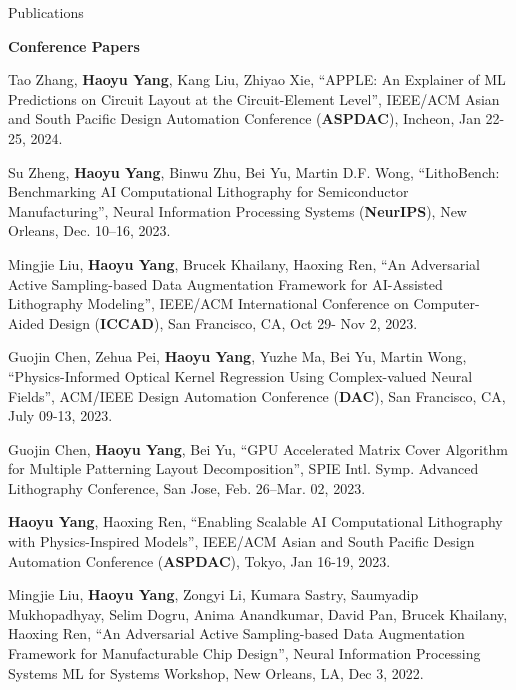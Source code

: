 \begin{rSection}{Publications}
\begin{description}[font=\normalfont]
\end{description}

\textbf{Conference Papers}
\begin{description}[font=\normalfont]
	
	\item[{[C31]}] Tao Zhang, \textbf{Haoyu Yang}, Kang Liu, Zhiyao Xie, ``APPLE: An Explainer of ML Predictions on Circuit Layout at the Circuit-Element Level'', IEEE/ACM Asian and South Pacific Design Automation Conference (\textbf{ASPDAC}), Incheon, Jan 22-25, 2024.
	
	
	
	\item[{[C30]}] Su Zheng, \textbf{Haoyu Yang}, Binwu Zhu, Bei Yu, Martin D.F. Wong, ``LithoBench: Benchmarking AI Computational Lithography for Semiconductor Manufacturing'', Neural Information Processing Systems (\textbf{NeurIPS}), New Orleans, Dec. 10–16, 2023.
	
		
	\item[{[C29]}] Mingjie Liu, \textbf{Haoyu Yang}, Brucek Khailany, Haoxing Ren, ``An Adversarial Active Sampling-based Data Augmentation Framework for AI-Assisted Lithography Modeling'', IEEE/ACM International Conference on Computer-Aided Design (\textbf{ICCAD}), San Francisco, CA, Oct 29- Nov 2, 2023.
	
	\item[{[C28]}] Guojin Chen, Zehua Pei, \textbf{Haoyu Yang}, Yuzhe Ma, Bei Yu, Martin Wong, ``Physics-Informed Optical Kernel Regression Using Complex-valued Neural Fields'', ACM/IEEE Design Automation Conference (\textbf{DAC}), San Francisco, CA, July 09-13, 2023.
	
		
	\item[{[C27]}] Guojin Chen, \textbf{Haoyu Yang}, Bei Yu, ``GPU Accelerated Matrix Cover Algorithm for Multiple Patterning Layout Decomposition'', SPIE Intl. Symp. Advanced Lithography Conference, San Jose, Feb. 26–Mar. 02, 2023.

	\item[{[C26]}] \textbf{Haoyu Yang}, Haoxing Ren, ``Enabling Scalable AI Computational Lithography with Physics-Inspired Models'', IEEE/ACM Asian and South Pacific Design Automation Conference (\textbf{ASPDAC}), Tokyo, Jan 16-19, 2023.
	
	\item[{[C25]}] Mingjie Liu, \textbf{Haoyu Yang}, Zongyi Li, Kumara Sastry, Saumyadip Mukhopadhyay, Selim Dogru, Anima Anandkumar, David Pan, Brucek Khailany, Haoxing Ren,
	``An Adversarial Active Sampling-based Data Augmentation Framework for Manufacturable Chip Design'',
	Neural Information Processing Systems ML for Systems Workshop, New Orleans, LA, Dec 3, 2022.
	

\end{description}
\end{rSection}
